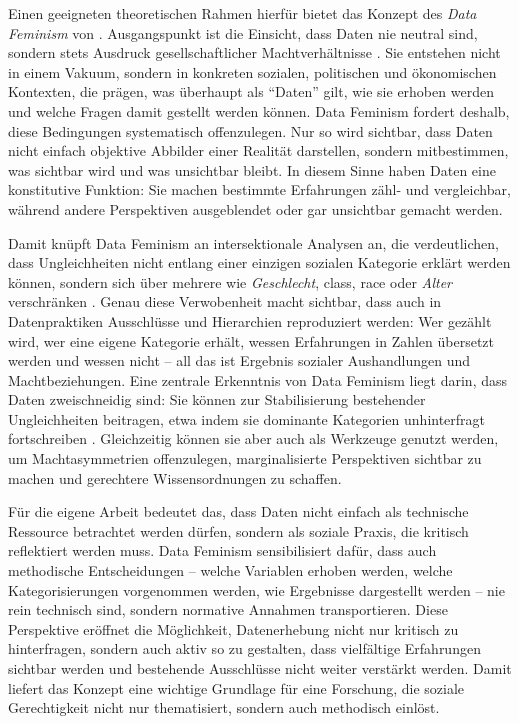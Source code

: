 Einen geeigneten theoretischen Rahmen hierfür bietet das Konzept des \textit{Data Feminism} von \textcite{dignazioDataFeminism2020}. Ausgangspunkt ist die Einsicht, dass Daten nie neutral sind, sondern stets Ausdruck gesellschaftlicher Machtverhältnisse \parencite[\gls{vgl}][\gls{s}~53ff.]{dignazioDataFeminism2020}. Sie entstehen nicht in einem Vakuum, sondern in konkreten sozialen, politischen und ökonomischen Kontexten, die prägen, was überhaupt als \enquote{Daten} gilt, wie sie erhoben werden und welche Fragen damit gestellt werden können. Data Feminism fordert deshalb, diese Bedingungen systematisch offenzulegen. Nur so wird sichtbar, dass Daten nicht einfach objektive Abbilder einer Realität darstellen, sondern mitbestimmen, was sichtbar wird und was unsichtbar bleibt. In diesem Sinne haben Daten eine konstitutive Funktion: Sie machen bestimmte Erfahrungen zähl- und vergleichbar, während andere Perspektiven ausgeblendet oder gar unsichtbar gemacht werden.

Damit knüpft Data Feminism an intersektionale Analysen an, die verdeutlichen, dass Ungleichheiten nicht entlang einer einzigen sozialen Kategorie erklärt werden können, sondern sich über mehrere  wie \emph{Geschlecht}, \gls{class}, \gls{race} oder \emph{Alter} verschränken \parencite[\gls{vgl}][\gls{s}~131ff.]{dignazioDataFeminism2020}. Genau diese Verwobenheit macht sichtbar, dass auch in Datenpraktiken Ausschlüsse und Hierarchien reproduziert werden: Wer gezählt wird, wer eine eigene Kategorie erhält, wessen Erfahrungen in Zahlen übersetzt werden und wessen nicht -- all das ist Ergebnis sozialer Aushandlungen und Machtbeziehungen. Eine zentrale Erkenntnis von Data Feminism liegt darin, dass Daten zweischneidig sind: Sie können zur Stabilisierung bestehender Ungleichheiten beitragen, etwa indem sie dominante Kategorien unhinterfragt fortschreiben \parencite[\gls{vgl}][\gls{s}~27]{dignazioDataFeminism2020}. Gleichzeitig können sie aber auch als Werkzeuge genutzt werden, um Machtasymmetrien offenzulegen, marginalisierte Perspektiven sichtbar zu machen und gerechtere Wissensordnungen zu schaffen.

Für die eigene Arbeit bedeutet das, dass Daten nicht einfach als technische Ressource betrachtet werden dürfen, sondern als soziale Praxis, die kritisch reflektiert werden muss. Data Feminism sensibilisiert dafür, dass auch methodische Entscheidungen -- welche Variablen erhoben werden, welche Kategorisierungen vorgenommen werden, wie Ergebnisse dargestellt werden -- nie rein technisch sind, sondern normative Annahmen transportieren. Diese Perspektive eröffnet die Möglichkeit, Datenerhebung nicht nur kritisch zu hinterfragen, sondern auch aktiv so zu gestalten, dass vielfältige Erfahrungen sichtbar werden und bestehende Ausschlüsse nicht weiter verstärkt werden. Damit liefert das Konzept eine wichtige Grundlage für eine Forschung, die soziale Gerechtigkeit nicht nur thematisiert, sondern auch methodisch einlöst.

